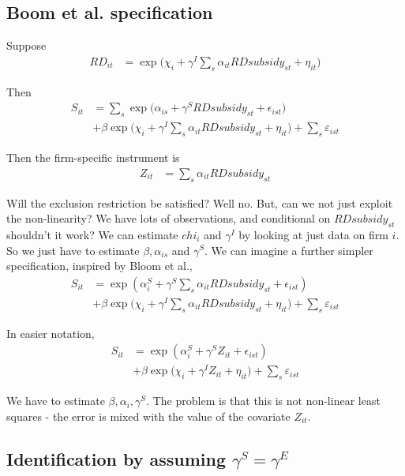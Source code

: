 \documentclass[12pt,english]{article}
\theoremstyle{remark}
\begin{document}
\subsection{Boom et al. specification}

Suppose
\begin{align}
	RD_{it} &= \exp \Big( \chi_i + \gamma^I \sum_s \alpha_{it} RDsubsidy_{st} + \eta_{it} \Big)
\end{align}

Then
\begin{align}
	S_{it} &= \sum_s \exp\Big(\alpha_{is} + \gamma^S RDsubsidy_{st} + \epsilon_{ist}\Big) \nonumber \\
			&+ \beta \exp \Big( \chi_i + \gamma^I \sum_s \alpha_{it} RDsubsidy_{st} + \eta_{it} \Big)  +  \sum_s \varepsilon_{ist} 	
\end{align}

Then the firm-specific instrument is
\begin{align}
	Z_{it} &= \sum_s \alpha_{it} RDsubsidy_{st} 
\end{align}

Will the exclusion restriction be satisfied? Well no. But, can we not just exploit the non-linearity? We have lots of observations, and conditional on $RDsubsidy_{st}$ shouldn't it work? We can estimate $chi_i$ and $\gamma^I$ by looking at just data on firm $i$. So we just have to estimate $\beta, \alpha_{is}$ and $\gamma^S$. We can imagine a further simpler specification, inspired by Bloom et al., 
\begin{align}
	S_{it} &= \exp(\alpha_i^S + \gamma^S \sum_s \alpha_{it} RDsubsidy_{st} + \epsilon_{ist}) \nonumber \\
			&+ \beta \exp \Big( \chi_i + \gamma^I \sum_s \alpha_{it} RDsubsidy_{st} + \eta_{it} \Big)  +  \sum_s \varepsilon_{ist} 	
\end{align}

In easier notation,
\begin{align}
	S_{it} &= \exp(\alpha_i^S + \gamma^S Z_{it} + \epsilon_{ist}) \nonumber \\ 
			&+ \beta \exp \Big( \chi_i + \gamma^I Z_{it} + \eta_{it} \Big)  +  \sum_s \varepsilon_{ist} \label{Spinout entry}
\end{align}

We have to estimate $\beta, \alpha_i, \gamma^S$. The problem is that this is not non-linear least squares - the error is mixed with the value of the covariate $Z_{it}$. 

\subsection{Identification by assuming $\gamma^S = \gamma^E$}
\end{document}
